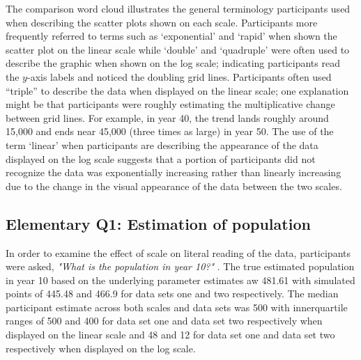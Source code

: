\documentclass[print]{nuthesis}
\begin{document}
The comparison word cloud illustrates the general terminology participants used when describing the scatter plots shown on each scale.
Participants more frequently referred to terms such as `exponential' and `rapid' when shown the scatter plot on the linear scale while `double' and `quadruple' were often used to describe the graphic when shown on the log scale; indicating participants read the \(y\)-axis labels and noticed the doubling grid lines.
Participants often used ``triple'' to describe the data when displayed on the linear scale; one explanation might be that participants were roughly estimating the multiplicative change between grid lines.
For example, in year 40, the trend lands roughly around 15,000 and ends near 45,000 (three times as large) in year 50.
The use of the term `linear' when participants are describing the appearance of the data displayed on the log scale suggests that a portion of participants did not recognize the data was exponentially increasing rather than linearly increasing due to the change in the visual appearance of the data between the two scales.

\hypertarget{elementary-q1-estimation-of-population}{%
\subsection{Elementary Q1: Estimation of population}\label{elementary-q1-estimation-of-population}}

In order to examine the effect of scale on literal reading of the data, participants were asked, \textit{"What is the population in year 10?"} .
The true estimated population in year 10 based on the underlying parameter estimates aw 481.61 with simulated points of 445.48 and 466.9 for data sets one and two respectively.
The median participant estimate across both scales and data sets was 500 with innerquartile ranges of 500 and 400 for data set one and data set two respectively when displayed on the linear scale and 48 and 12 for data set one and data set two respectively when displayed on the log scale.
\end{document}
